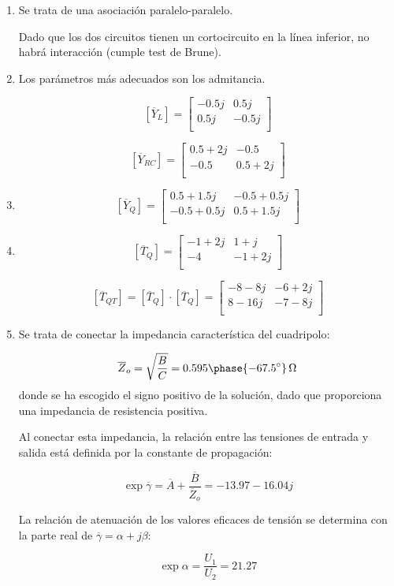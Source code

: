 \documentclass[12pt]{article}
\begin{document}
\begin{enumerate}
\item

  Se trata de una asociación paralelo-paralelo.

  Dado que los dos circuitos tienen un cortocircuito en la línea inferior, no habrá interacción (cumple test de Brune).
\item

  Los parámetros más adecuados son los admitancia.

  \[
  [\overline{Y}_L] = 
  \left[
    \begin{array}{cc}
       -0.5j &  0.5j\\
      0.5j & -0.5j\\
    \end{array}
  \right]
\]

\[
  [\overline{Y}_{RC}] = 
  \left[
    \begin{array}{cc}
      0.5+2j & -0.5\\
      -0.5 & 0.5+2j\\
    \end{array}
  \right]
\]
\item
  \[
  [\overline{Y}_Q] = 
  \left[
    \begin{array}{cc}
      0.5+1.5j & -0.5+0.5j\\
      -0.5+0.5j & 0.5+1.5j\\
    \end{array}
  \right]
\]
\item
\[
  [\overline{T}_Q] = 
  \left[
    \begin{array}{cc}
      -1+2j & 1+j\\
      -4 & -1+2j\\
    \end{array}
  \right]
\]

  \[
    [\overline{T}_{QT}] = [\overline{T}_Q] \cdot [\overline{T}_Q] =
  \left[
    \begin{array}{cc}
      -8-8j & -6+2j\\
      8-16j & -7-8j\\
    \end{array}
  \right]
\]

\item
  Se trata de conectar la impedancia característica del cuadripolo:

  \[
    \overline{Z}_o = \sqrt{\frac{B}{C}} = \SI[parse-numbers=false]{0.595\phase{\ang{-67.5}}}{\ohm}
  \]
  donde se ha escogido el signo positivo de la solución, dado que proporciona una impedancia de resistencia positiva.

  Al conectar esta impedancia, la relación entre las tensiones de entrada y salida está definida por la constante de propagación:

  \[
    \exp{\overline{\gamma}} = \overline{A} + \frac{\overline{B}}{\overline{Z}_o} = -13.97 - 16.04j
  \]

  La relación de atenuación de los valores eficaces de tensión se determina con la parte real de $\overline{\gamma} = \alpha + j\beta$:

  \[
    \exp{\alpha} = \frac{U_1}{U_2} = 21.27
  \]
  
\end{enumerate}
\end{document}

